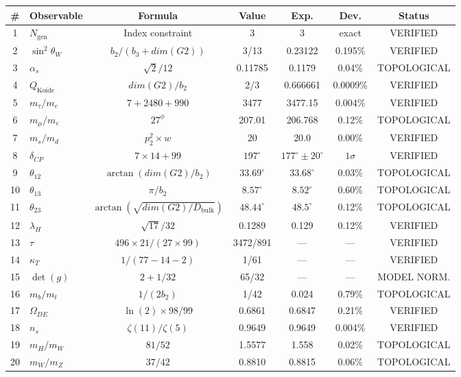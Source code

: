 \documentclass[11pt,a4paper]{article}
\newcommand{\Gtwo}{\mathrm{G}_2}
\newcommand{\dimE}{\mathrm{dim}}
\newcommand{\Weyl}{w}
\newcommand{\CP}{\mathrm{CP}}
\newcommand{\DE}{\mathrm{DE}}
\def\CP{CP}%
\def\Gtwo{G2}%
\def\dimE{dim}%
\def\Weyl{w}%
\def\DE{DE}%
\begin{document}
\begin{table}[H]
\centering
\small
\begin{tabular}{clccccc}
\toprule
\# & Observable & Formula & Value & Exp. & Dev. & Status \\
\midrule
1 & $N_{\mathrm{gen}}$ & Index constraint & 3 & 3 & exact & VERIFIED \\
2 & $\sin^2\theta_W$ & $b_2/(b_3 + \dimE(\Gtwo))$ & 3/13 & 0.23122 & 0.195\% & VERIFIED \\
3 & $\alpha_s$ & $\sqrt{2}/12$ & 0.11785 & 0.1179 & 0.04\% & TOPOLOGICAL \\
4 & $Q_{\mathrm{Koide}}$ & $\dimE(\Gtwo)/b_2$ & 2/3 & 0.666661 & 0.0009\% & VERIFIED \\
5 & $m_\tau/m_e$ & $7 + 2480 + 990$ & 3477 & 3477.15 & 0.004\% & VERIFIED \\
6 & $m_\mu/m_e$ & $27^\phi$ & 207.01 & 206.768 & 0.12\% & TOPOLOGICAL \\
7 & $m_s/m_d$ & $p_2^2 \times \Weyl$ & 20 & 20.0 & 0.00\% & VERIFIED \\
8 & $\delta_{\CP}$ & $7 \times 14 + 99$ & $197^\circ$ & $177^\circ \pm 20^\circ$ & $1\sigma$ & VERIFIED \\
9 & $\theta_{12}$ & $\arctan(\dimE(\Gtwo)/b_2)$ & $33.69^\circ$ & $33.68^\circ$ & 0.03\% & TOPOLOGICAL \\
10 & $\theta_{13}$ & $\pi/b_2$ & $8.57^\circ$ & $8.52^\circ$ & 0.60\% & TOPOLOGICAL \\
11 & $\theta_{23}$ & $\arctan(\sqrt{\dimE(\Gtwo)/D_{\mathrm{bulk}}})$ & $48.44^\circ$ & $48.5^\circ$ & 0.12\% & TOPOLOGICAL \\
12 & $\lambda_H$ & $\sqrt{17}/32$ & 0.1289 & 0.129 & 0.12\% & VERIFIED \\
13 & $\tau$ & $496 \times 21/(27 \times 99)$ & 3472/891 & --- & --- & VERIFIED \\
14 & $\kappa_T$ & $1/(77-14-2)$ & 1/61 & --- & --- & VERIFIED \\
15 & $\det(g)$ & $2 + 1/32$ & 65/32 & --- & --- & MODEL NORM. \\
16 & $m_b/m_t$ & $1/(2b_2)$ & 1/42 & 0.024 & 0.79\% & TOPOLOGICAL \\
17 & $\Omega_{\DE}$ & $\ln(2) \times 98/99$ & 0.6861 & 0.6847 & 0.21\% & VERIFIED \\
18 & $n_s$ & $\zeta(11)/\zeta(5)$ & 0.9649 & 0.9649 & 0.004\% & VERIFIED \\
19 & $m_H/m_W$ & $81/52$ & 1.5577 & 1.558 & 0.02\% & TOPOLOGICAL \\
20 & $m_W/m_Z$ & $37/42$ & 0.8810 & 0.8815 & 0.06\% & TOPOLOGICAL \\

\end{tabular}
\end{table}
\end{document}
